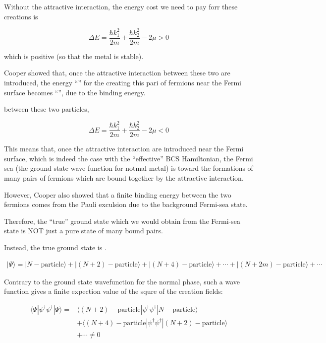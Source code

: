 ﻿\documentclass[twoside]{book}
\numberwithin{equation}{section}
\begin{document}
Without the attractive interaction, the energy cost we need to pay forr these creations is 

\[\Delta E = \frac{\hbar k_1^2}{2m} + \frac{\hbar k_2^2}{2m}-2\mu > 0 \]

which is positive (so that the metal is stable). 

Cooper showed that, once the {} attractive interaction between these two are introduced, the energy ``'' for the creating this pari of fermions near the Fermi surface becomes ``'', due to the binding energy. 

between these two particles, 

\[\Delta E = \frac{\hbar k_1^2}{2m} + \frac{\hbar k_2^2}{2m}-2\mu < 0 \]

This means that, once the attractive interaction are introduced near the Fermi surface, which is indeed the case with the ``effective'' BCS Hamiltonian, the Fermi sea (the ground state wave function for notmal metal) is  toward the formations of many pairs of fermions which are bound together by the attractive interaction. 

However, Cooper also showed that a finite binding energy between the two fermions comes from the Pauli exculsion due to the background Fermi-sea state. 

Therefore, the ``true'' ground state which we would obtain from the Fermi-sea state is NOT just a pure state of many bound pairs. 

Instead, the true ground state is . 

\begin{align}\tag{A} \label{eqA}
|\Psi\rangle = |N-\text{particle}\rangle + |(N+2)-\text{particle}\rangle + |(N+4)-\text{particle}\rangle + \cdots + |(N+2m)-\text{particle}\rangle + \cdots \end{align}

Contrary to the ground state wavefunction for the normal phase, such a wave function gives a finite expection value of the squre of the creation fields: 

\[\begin{split}
\langle \Psi|\psi^{\dagger}\psi^{\dagger}|\Psi\rangle =& \langle (N+2)-\text{particle}|\psi^{\dagger}\psi^{\dagger}|N-\text{particle}\rangle \\ &+ \langle(N+4)-\text{particle}|\psi^{\dagger}\psi^{\dagger}|(N+2)-\text{particle}\rangle\\ & + \cdots \neq 0 \end{split}\]
\end{document}
